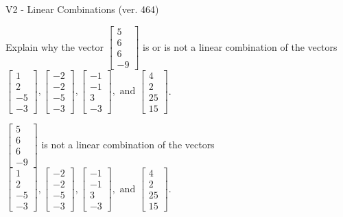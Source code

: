 \begin{exercise}
  \begin{exerciseTitle}V2 - Linear Combinations (ver. 464)\end{exerciseTitle}
  \begin{exerciseStatement}
    Explain why the vector \(\left[\begin{array}{c}
5 \\
6 \\
6 \\
-9
\end{array}\right]\)  is or is not a linear 
	combination of the vectors \(\left[\begin{array}{c}
1 \\
2 \\
-5 \\
-3
\end{array}\right] , \left[\begin{array}{c}
-2 \\
-2 \\
-5 \\
-3
\end{array}\right] , \left[\begin{array}{c}
-1 \\
-1 \\
3 \\
-3
\end{array}\right] , \text{ and } \left[\begin{array}{c}
4 \\
2 \\
25 \\
15
\end{array}\right]\).
	


  \end{exerciseStatement}
  \begin{exerciseAnswer}
   \(\left[\begin{array}{c}
5 \\
6 \\
6 \\
-9
\end{array}\right]\) 
  	 is not  
	a linear combination of the vectors \(\left[\begin{array}{c}
1 \\
2 \\
-5 \\
-3
\end{array}\right] , \left[\begin{array}{c}
-2 \\
-2 \\
-5 \\
-3
\end{array}\right] , \left[\begin{array}{c}
-1 \\
-1 \\
3 \\
-3
\end{array}\right] , \text{ and } \left[\begin{array}{c}
4 \\
2 \\
25 \\
15
\end{array}\right]\).


\end{exerciseAnswer}
\end{exercise}
